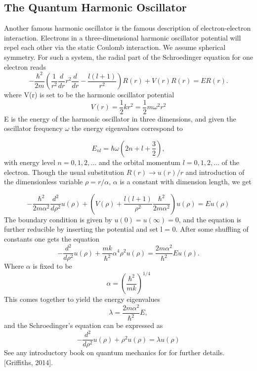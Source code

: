 \documentclass[%
reprint,
amsmath,amssymb,
aps,
]{revtex4-1}
\begin{document}
\subsection{The Quantum Harmonic Oscillator} \noindent 
Another famous harmonic oscillator is the famous description of electron-electron interaction. Electrons in a three-dimensional harmonic oscillator potential will repel each other via the static Coulomb interaction. We assume spherical symmetry. For such a system, the radial part of the Schroedinger equation for one electron reads
\begin{equation*}
-\frac{\hbar^2}{2 m} \left ( \frac{1}{r^2} \frac{d}{dr} r^2
\frac{d}{dr} - \frac{l (l + 1)}{r^2} \right )R(r) 
+ V(r) R(r) = E R(r).
\end{equation*}
where V(r) is set to be the harmonic oscillator potential 
\begin{equation*}
	V(r) = \dfrac{1}{2}kr^2 = \dfrac{1}{2}m\omega^2r^2
\end{equation*}
E is the energy of the harmonic oscillator in three dimensions, and given the oscillator frequency $\omega$ the energy eigenvalues correspond to 

\begin{equation*}
E_{nl}=  \hbar \omega \left(2n+l+\frac{3}{2}\right),
\end{equation*}
with energy level $n=0,1,2,\dots$ and the orbital momentum $l=0,1,2,\dots$ of the electron. Though the usual substitution $R(r) \rightarrow u(r)/r$ and introduction of the dimensionless variable $\rho = r/\alpha$, $\alpha$ is a constant with dimension length, we get

\begin{equation*}
-\frac{\hbar^2}{2 m \alpha^2} \frac{d^2}{d\rho^2} u(\rho) 
+ \left ( V(\rho) + \frac{l (l + 1)}{\rho^2}
\frac{\hbar^2}{2 m\alpha^2} \right ) u(\rho)  = E u(\rho)
\end{equation*}
The boundary condition is given by $u(0) = u(\infty) = 0$, and the equation is further reducible by inserting the potential and set l = 0. After some shuffling of constants one gets the equation  
\begin{equation*}
-\frac{d^2}{d\rho^2} u(\rho) 
+ \frac{mk}{\hbar^2} \alpha^4\rho^2u(\rho)  = \frac{2m\alpha^2}{\hbar^2}E u(\rho) .
\end{equation*}
Where $\alpha$ is fixed to be 
\begin{equation*}
\alpha = \left(\frac{\hbar^2}{mk}\right)^{1/4}
\end{equation*}
This comes together to yield the energy eigenvalues 
\begin{equation*}
\lambda = \frac{2m\alpha^2}{\hbar^2}E,
\end{equation*}
and the Schroedinger's equation can be expressed as
\begin{equation}\label{qho}
-\frac{d^2}{d\rho^2} u(\rho) + \rho^2u(\rho)  = \lambda u(\rho)
\end{equation}
See any introductory book on quantum mechanics for for further details. [Griffiths, 2014]. 
\end{document}
